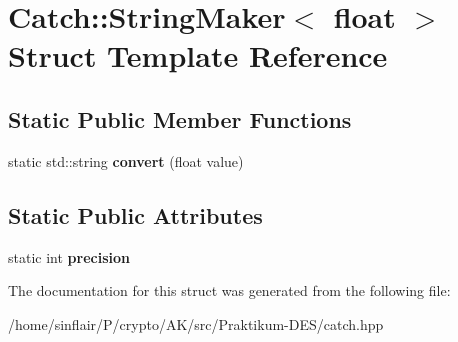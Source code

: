 \hypertarget{structCatch_1_1StringMaker_3_01float_01_4}{}\section{Catch\+:\+:String\+Maker$<$ float $>$ Struct Template Reference}
\label{structCatch_1_1StringMaker_3_01float_01_4}
\subsection*{Static Public Member Functions}
\begin{DoxyCompactItemize}
\item 
\mbox{\label{structCatch_1_1StringMaker_3_01float_01_4_a7ffacc6fa46a338200f3fbb2ee078648}} 
static std\+::string {\bfseries convert} (float value)
\end{DoxyCompactItemize}
\subsection*{Static Public Attributes}
\begin{DoxyCompactItemize}
\item 
\mbox{\label{structCatch_1_1StringMaker_3_01float_01_4_a54ebebe76a755dbe2dd8ad409c329378}} 
static int {\bfseries precision}
\end{DoxyCompactItemize}


The documentation for this struct was generated from the following file\+:\begin{DoxyCompactItemize}
\item 
/home/sinflair/\+P/crypto/\+A\+K/src/\+Praktikum-\/\+D\+E\+S/catch.\+hpp\end{DoxyCompactItemize}
